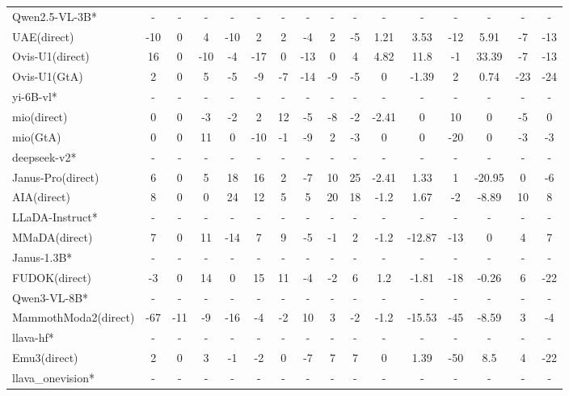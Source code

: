 \documentclass{article}
\providecommand{\rowcolor}[1]{}
\theoremstyle{plain}
\theoremstyle{definition}
\theoremstyle{remark}
\begin{document}
\begin{table}[!htbp]
{\begin{tabular}{@{}lccccccccccccccc@{}}
\midrule
\rowcolor{gray!12}
Qwen2.5-VL-3B* & - & - & - & - & - & - & - & - & - & - & - & - & - & - & - \\
UAE(direct) & -10 & 0 & 4 & -10 & 2 & 2 & -4 & 2 & -5 & 1.21 & 3.53 & -12 & 5.91 & -7 & -13 \\
Ovis-U1(direct) & 16 & 0 & -10 & -4 & -17 & 0 & -13 & 0 & 4 & 4.82 & 11.8 & -1 & 33.39 & -7 & -13 \\
Ovis-U1(GtA) & 2 & 0 & 5 & -5 & -9 & -7 & -14 & -9 & -5 & 0 & -1.39 & 2 & 0.74 & -23 & -24 \\
\midrule
\rowcolor{gray!12}
yi-6B-vl* & - & - & - & - & - & - & - & - & - & - & - & - & - & - & - \\
mio(direct) & 0 & 0 & -3 & -2 & 2 & 12 & -5 & -8 & -2 & -2.41 & 0 & 10 & 0 & -5 & 0 \\
mio(GtA) & 0 & 0 & 11 & 0 & -10 & -1 & -9 & 2 & -3 & 0 & 0 & -20 & 0 & -3 & -3 \\
\midrule
\rowcolor{gray!12}
deepseek-v2* & - & - & - & - & - & - & - & - & - & - & - & - & - & - & - \\
Janus-Pro(direct) & 6 & 0 & 5 & 18 & 16 & 2 & -7 & 10 & 25 & -2.41 & 1.33 & 1 & -20.95 & 0 & -6 \\
AIA(direct) & 8 & 0 & 0 & 24 & 12 & 5 & 5 & 20 & 18 & -1.2 & 1.67 & -2 & -8.89 & 10 & 8 \\
\midrule
\rowcolor{gray!12}
LLaDA-Instruct* & - & - & - & - & - & - & - & - & - & - & - & - & - & - & - \\
MMaDA(direct) & 7 & 0 & 11 & -14 & 7 & 9 & -5 & -1 & 2 & -1.2 & -12.87 & -13 & 0 & 4 & 7 \\
\midrule
\rowcolor{gray!12}
Janus-1.3B* & - & - & - & - & - & - & - & - & - & - & - & - & - & - & - \\
FUDOK(direct) & -3 & 0 & 14 & 0 & 15 & 11 & -4 & -2 & 6 & 1.2 & -1.81 & -18 & -0.26 & 6 & -22 \\
\midrule
\rowcolor{gray!12}
Qwen3-VL-8B* & - & - & - & - & - & - & - & - & - & - & - & - & - & - & - \\
MammothModa2(direct) & -67 & -11 & -9 & -16 & -4 & -2 & 10 & 3 & -2 & -1.2 & -15.53 & -45 & -8.59 & 3 & -4 \\
\midrule
\rowcolor{gray!12}
llava-hf* & - & - & - & - & - & - & - & - & - & - & - & - & - & - & - \\
Emu3(direct) & 2 & 0 & 3 & -1 & -2 & 0 & -7 & 7 & 7 & 0 & 1.39 & -50 & 8.5 & 4 & -22 \\
\midrule
\rowcolor{gray!12}
llava\_onevision* & - & - & - & - & - & - & - & - & - & - & - & - & - & - & - \\

\end{tabular}}
\end{table}
\end{document}
